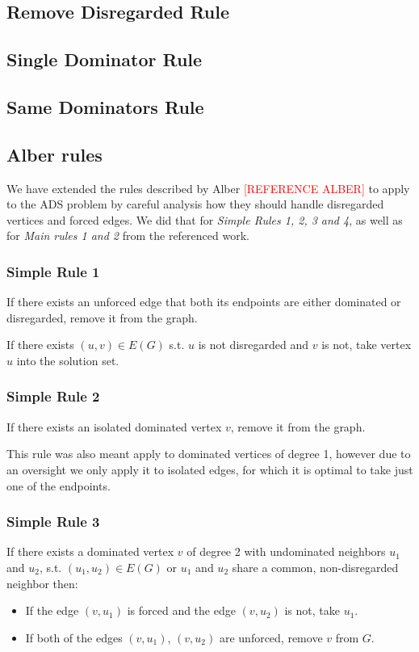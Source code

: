 \documentclass[a4paper,UKenglish,cleveref, autoref, thm-restate]{lipics-v2021}
\begin{document}
\subsection{Remove Disregarded Rule}

\subsection{Single Dominator Rule}

\subsection{Same Dominators Rule}

\subsection{Alber rules}

We have extended the rules described by Alber \textcolor{red}{[REFERENCE ALBER]} to apply to the ADS problem by careful analysis how
they should handle disregarded vertices and forced edges. We did that for \emph{Simple Rules 1, 2, 3 and 4}, as well as for \emph{Main rules 1 and 2} from the referenced work.
\subsubsection{Simple Rule 1}
If there exists an unforced edge that both its endpoints are either dominated or disregarded, remove it from the graph.

If there exists $(u, v) \in E(G)$ s.t. $u$ is not disregarded and $v$ is not, take vertex $u$ into the solution set.


\subsubsection{Simple Rule 2}
If there exists an isolated dominated vertex $v$, remove it from the graph.

This rule was also meant apply to dominated vertices of degree 1, however due to an oversight we only apply it to isolated edges, for which it is optimal to take just one of the endpoints.

\subsubsection{Simple Rule 3}
If there exists a dominated vertex $v$ of degree 2 with undominated neighbors $u_1$ and $u_2$, s.t. $(u_1, u_2) \in E(G)$ or $u_1$ and $u_2$ share a common, non-disregarded neighbor then:
\begin{itemize}
    \item If the edge $(v, u_1)$ is forced and the edge $(v, u_2)$ is not, take $u_1$.
    \item If both of the edges $(v, u_1)$, $(v, u_2)$ are unforced, remove $v$ from $G$.
\end{itemize}
\end{document}
